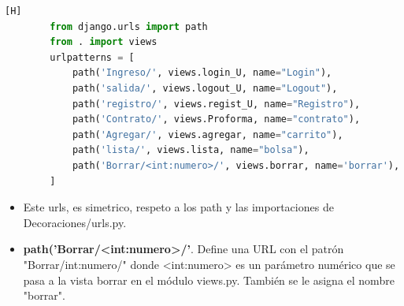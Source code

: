 \documentclass{article}
\begin{document}
    \begin{lstlisting}[language=python,caption={Usuario/urls.py}][H]
        from django.urls import path
        from . import views
        urlpatterns = [
            path('Ingreso/', views.login_U, name="Login"),
            path('salida/', views.logout_U, name="Logout"),
            path('registro/', views.regist_U, name="Registro"),
            path('Contrato/', views.Proforma, name="contrato"),
            path('Agregar/', views.agregar, name="carrito"),
            path('lista/', views.lista, name="bolsa"),
            path('Borrar/<int:numero>/', views.borrar, name='borrar'),
        ]
    \end{lstlisting}
	\begin{itemize}
	    \item Este urls, es simetrico, respeto a los path y las importaciones de Decoraciones/urls.py.
        \item \textbf{path('Borrar/<int:numero>/'}. Define una URL con el patrón "Borrar/int:numero/" donde <int:numero> es un parámetro numérico que se pasa a la vista borrar en el módulo views.py. También se le asigna el nombre "borrar".
    \end{itemize}
\end{document}
